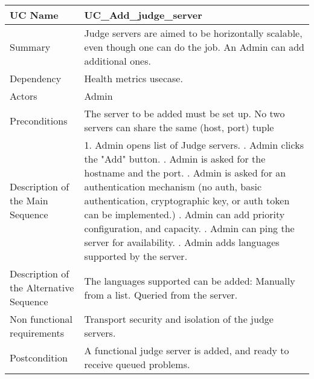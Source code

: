 \begin{table}[htbp]
\centering
\begin{tabularx}{\textwidth}{|l|X|}
\hline
UC Name & UC\_Add\_judge\_server \\ \hline

Summary &  Judge servers are aimed to be horizontally scalable, even though one can do the job. An Admin can add additional ones. \\ \hline

Dependency & \- Health metrics usecase. \\ \hline

Actors & Admin \\ \hline

Preconditions & \- The server to be added must be set up. \newline \- No two servers can share the same (host, port) tuple \\ \hline

Description of the Main Sequence & 1. Admin opens list of Judge servers. \newline 2. Admin clicks the "Add" button. \newline 3. Admin is asked for the hostname and the port. \newline 4. Admin is asked for an authentication mechanism (no auth, basic authentication, cryptographic key, or auth token can be implemented.) \newline 5. Admin can add priority configuration, and capacity. \newline 6. Admin can ping the server for availability. \newline 7. Admin adds languages supported by the server. \\ \hline

Description of the Alternative Sequence & The languages supported can be added: \newline \- Manually from a list. \newline \- Queried from the server. \\ \hline

Non functional requirements & \- Transport security and isolation of the judge servers. \newline \\ \hline

Postcondition & A functional judge server is added, and ready to receive queued problems. \\ \hline

\end{tabularx}
\end{table}

